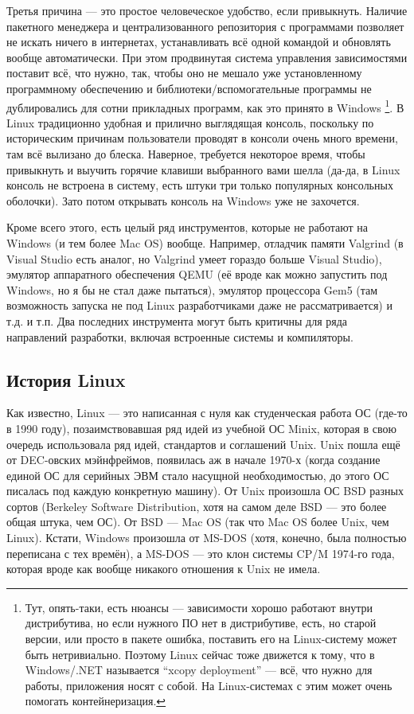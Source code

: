 \documentclass{../../text-style}
\begin{document}
Третья причина --- это простое человеческое удобство, если привыкнуть.
Наличие пакетного менеджера и централизованного репозитория с программами позволяет не искать ничего в интернетах, устанавливать всё одной командой и обновлять вообще автоматически.
При этом продвинутая система управления зависимостями поставит всё, что нужно, так, чтобы оно не мешало уже установленному программному обеспечению и библиотеки/вспомогательные программы не дублировались для сотни прикладных программ, как это принято в Windows%
\footnote{Тут, опять-таки, есть нюансы --- зависимости хорошо работают внутри дистрибутива, но если нужного ПО нет в дистрибутиве, есть, но старой версии, или просто в пакете ошибка, поставить его на Linux-систему может быть нетривиально. Поэтому Linux сейчас тоже движется к тому, что в Windows/.NET называется \enquote{xcopy deployment} --- всё, что нужно для работы, приложения носят с собой. На Linux-системах с этим может очень помогать контейнеризация.}.
В Linux традиционно удобная и прилично выглядящая консоль, поскольку по историческим причинам пользователи проводят в консоли очень много времени, там всё вылизано до блеска.
Наверное, требуется некоторое время, чтобы привыкнуть и выучить горячие клавиши выбранного вами шелла (да-да, в Linux консоль не встроена в систему, есть штуки три только популярных консольных оболочки).
Зато потом открывать консоль на Windows уже не захочется.

Кроме всего этого, есть целый ряд инструментов, которые не работают на Windows (и тем более Mac OS) вообще.
Например, отладчик памяти Valgrind (в Visual Studio есть аналог, но Valgrind умеет гораздо больше Visual Studio), эмулятор аппаратного обеспечения QEMU (её вроде как можно запустить под Windows, но я бы не стал даже пытаться), эмулятор процессора Gem5 (там возможность запуска не под Linux разработчиками даже не рассматривается) и т.д. и т.п.
Два последних инструмента могут быть критичны для ряда направлений разработки, включая встроенные системы и компиляторы.

\subsection{История Linux}

Как известно, Linux --- это написанная с нуля как студенческая работа ОС (где-то в 1990 году), позаимствовавшая ряд идей из учебной ОС Minix, которая в свою очередь использовала ряд идей, стандартов и соглашений Unix.
Unix пошла ещё от DEC-овских мэйнфреймов, появилась аж в начале 1970-х (когда создание единой ОС для серийных ЭВМ стало насущной необходимостью, до этого ОС писалась под каждую конкретную машину).
От Unix произошла ОС BSD разных сортов (Berkeley Software Distribution, хотя на самом деле BSD --- это более общая штука, чем ОС).
От BSD --- Mac OS (так что Mac OS более Unix, чем Linux).
Кстати, Windows произошла от MS-DOS (хотя, конечно, была полностью переписана с тех времён), а MS-DOS --- это клон системы CP/M 1974-го года, которая вроде как вообще никакого отношения к Unix не имела.
\end{document}
